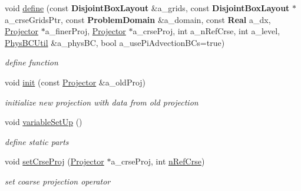 \begin{DoxyCompactItemize}
\mbox{\label{class_projector_a3749cb76ce7aee935cd62e2f3003993d}} 
void \hyperlink{class_projector_a3749cb76ce7aee935cd62e2f3003993d}{define} (const \textbf{ Disjoint\+Box\+Layout} \&a\+\_\+grids, const \textbf{ Disjoint\+Box\+Layout} $\ast$a\+\_\+crse\+Grids\+Ptr, const \textbf{ Problem\+Domain} \&a\+\_\+domain, const \textbf{ Real} a\+\_\+dx, \hyperlink{class_projector}{Projector} $\ast$a\+\_\+finer\+Proj, \hyperlink{class_projector}{Projector} $\ast$a\+\_\+crse\+Proj, int a\+\_\+n\+Ref\+Crse, int a\+\_\+level, \hyperlink{class_phys_b_c_util}{Phys\+B\+C\+Util} \&a\+\_\+phys\+BC, bool a\+\_\+use\+Pi\+Advection\+B\+Cs=true)
\begin{DoxyCompactList}\small\item\em define function \end{DoxyCompactList}\item 
\mbox{\label{class_projector_a271c94f164d08cf5e220e3e5fbcd9725}} 
void \hyperlink{class_projector_a271c94f164d08cf5e220e3e5fbcd9725}{init} (const \hyperlink{class_projector}{Projector} \&a\+\_\+old\+Proj)
\begin{DoxyCompactList}\small\item\em initialize new projection with data from old projection \end{DoxyCompactList}\item 
\mbox{\label{class_projector_a29ae6c2bf314d8f4a3edc801ec56036f}} 
void \hyperlink{class_projector_a29ae6c2bf314d8f4a3edc801ec56036f}{variable\+Set\+Up} ()
\begin{DoxyCompactList}\small\item\em define static parts \end{DoxyCompactList}\item 
\mbox{\label{class_projector_aff8434c93bc06d73e50894edf3170b9f}} 
void \hyperlink{class_projector_aff8434c93bc06d73e50894edf3170b9f}{set\+Crse\+Proj} (\hyperlink{class_projector}{Projector} $\ast$a\+\_\+crse\+Proj, int \hyperlink{class_projector_ad602a3f4c02994971e2bffd71cbb5ba0}{n\+Ref\+Crse})
\begin{DoxyCompactList}\small\item\em set coarse projection operator \end{DoxyCompactList}\item 
\mbox{\label{class_projector_aafcccb9f646a75efa56c32c83e1a41c1}} 

\end{DoxyCompactItemize}
